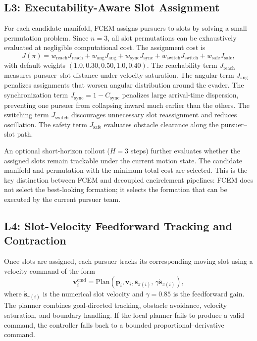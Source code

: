 \documentclass[journal]{IEEEtran}
\newcommand{\Csync}{C_{\mathrm{sync}}}
\begin{document}
\subsection{L3: Executability-Aware Slot Assignment}
\label{sec:l3}

For each candidate manifold, FCEM assigns pursuers to slots by solving a small permutation problem.
Since $n=3$, all slot permutations can be exhaustively evaluated at negligible computational cost.
The assignment cost is
\begin{equation}
  J(\pi) =
  w_{\mathrm{reach}} J_{\mathrm{reach}}
  + w_{\mathrm{ang}} J_{\mathrm{ang}}
  + w_{\mathrm{sync}} J_{\mathrm{sync}}
  + w_{\mathrm{switch}} J_{\mathrm{switch}}
  + w_{\mathrm{safe}} J_{\mathrm{safe}},
  \label{eq:assign_cost}
\end{equation}
with default weights $(1.0, 0.30, 0.50, 1.0, 0.40)$.
The reachability term $J_{\mathrm{reach}}$ measures pursuer--slot distance under velocity saturation.
The angular term $J_{\mathrm{ang}}$ penalizes assignments that worsen angular distribution around the evader.
The synchronization term $J_{\mathrm{sync}} = 1 - \Csync$ penalizes large arrival-time dispersion, preventing one pursuer from collapsing inward much earlier than the others.
The switching term $J_{\mathrm{switch}}$ discourages unnecessary slot reassignment and reduces oscillation.
The safety term $J_{\mathrm{safe}}$ evaluates obstacle clearance along the pursuer--slot path.

An optional short-horizon rollout ($H=3$ steps) further evaluates whether the assigned slots remain trackable under the current motion state.
The candidate manifold and permutation with the minimum total cost are selected.
This is the key distinction between FCEM and decoupled encirclement pipelines: FCEM does not select the best-looking formation; it selects the formation that can be executed by the current pursuer team.

\subsection{L4: Slot-Velocity Feedforward Tracking and Contraction}
\label{sec:l4}

Once slots are assigned, each pursuer tracks its corresponding moving slot using a velocity command of the form
\begin{equation}
  \mathbf{v}_i^{\mathrm{cmd}} =
  \mathrm{Plan}\!\left(
    \mathbf{p}_i, \mathbf{v}_i, \mathbf{s}_{\pi(i)},\, \gamma \dot{\mathbf{s}}_{\pi(i)}
  \right),
  \label{eq:tracking}
\end{equation}
where $\dot{\mathbf{s}}_{\pi(i)}$ is the numerical slot velocity and $\gamma = 0.85$ is the feedforward gain.
The planner combines goal-directed tracking, obstacle avoidance, velocity saturation, and boundary handling.
If the local planner fails to produce a valid command, the controller falls back to a bounded proportional--derivative command.
\end{document}
